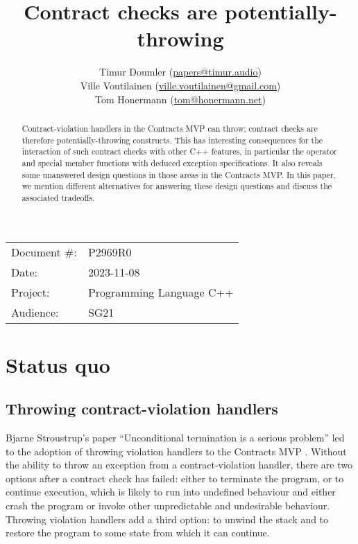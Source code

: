 


\title{Contract checks are potentially-throwing}
\author{ Timur Doumler \small(\href{mailto:papers@timur.audio}{papers@timur.audio}) \\
Ville Voutilainen \small(\href{mailto:ville.voutilainen@gmail.com}{ville.voutilainen@gmail.com}) \\
Tom Honermann \small(\href{mailto:tom@honermann.net}{tom@honermann.net})
}
\date{}
\maketitle


\begin{tabular}{ll}
Document \#: & P2969R0 \\
Date: &2023-11-08 \\
Project: & Programming Language C++ \\
Audience: & SG21
\end{tabular}

\begin{abstract}
Contract-violation handlers in the Contracts MVP can throw; contract checks are therefore potentially-throwing constructs. This has interesting consequences for the interaction of such contract checks with other C++ features, in particular the  operator and special member functions with deduced exception specifications. It also reveals some unanswered design questions in those areas in the Contracts MVP. In this paper, we mention different alternatives for answering these design questions and discuss the associated tradeoffs.
\end{abstract}



\section{Status quo}
\subsection{Throwing contract-violation handlers}

Bjarne Stroustrup's paper ``Unconditional termination is a serious problem'' \cite{P2698R0} led to the adoption of throwing violation handlers to the Contracts MVP \cite{P2900R1}. Without the ability to throw an exception from a contract-violation handler, there are two options after a contract check has failed: either to terminate the program, or to continue execution, which is likely to run into undefined behaviour and either crash the program or invoke other unpredictable and undesirable behaviour. Throwing violation handlers add a third option: to unwind the stack and to restore the program to some state from which it can continue.

